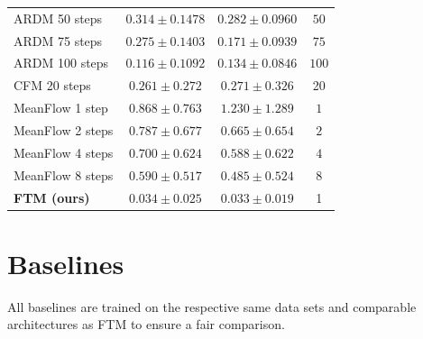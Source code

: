 \documentclass[oneside,11pt]{article}
\theoremstyle{remark}
\begin{document}
\begin{table}
\begin{tabular}{lccc}
ARDM 50 steps \cite{KOHL2026108641} 
& $0.314 \pm 0.1478$
& $0.282 \pm 0.0960$
& $50$ \\

ARDM 75 steps \cite{KOHL2026108641} 
& $0.275 \pm 0.1403$
& $0.171 \pm 0.0939$
& $75$ \\
ARDM 100 steps \cite{KOHL2026108641} 
& $0.116 \pm 0.1092$
& $0.134 \pm 0.0846$
& $100$ \\
CFM 20 steps
& $0.261 \pm 0.272$
& $0.271 \pm 0.326$
& 20 \\
MeanFlow 1 step
& $0.868 \pm 0.763$
& $1.230 \pm 1.289$
& $1$ \\
MeanFlow 2 steps
& $0.787 \pm 0.677$
& $0.665 \pm 0.654$
& $2$ \\
MeanFlow 4 steps
& $0.700 \pm 0.624$
& $0.588 \pm 0.622$
& $4$ \\
MeanFlow 8 steps
& $0.590 \pm 0.517$
& $0.485 \pm 0.524$
& $8$ \\
\textbf{FTM (ours)}
& $\mathbf{0.034 \pm 0.025}$
& $\mathbf{0.033 \pm 0.019}$
& 1 \\
\bottomrule
\end{tabular}
\end{table}









































\section{Baselines}\label{appendix:Baselines}
\label{appendix:DirectEstimationOfV}

All baselines are trained on the respective same data sets and comparable architectures as FTM to ensure a fair comparison.
\end{document}
